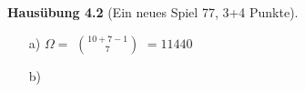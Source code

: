 \textbf{Hausübung 4.2} (Ein neues Spiel 77, 3+4 Punkte).
\begin{enumerate}
		\item[a)] 
				$\Omega = $ $ 10 + 7 - 1 \choose 7 $ $ = 11440 $
		
		\item[b)] 
\end{enumerate}
